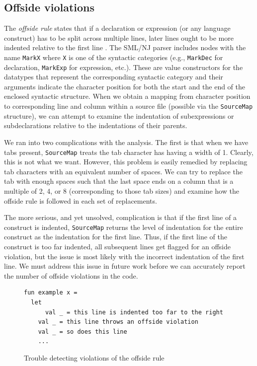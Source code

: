 \documentclass[12pt,abstracton]{scrartcl}
\begin{document}
\subsection{Offside violations}\label{subsec:offside}
The \emph{offside rule} states that if a declaration or expression (or any language construct)
has to be split across multiple lines, later lines ought to be more indented relative to
the first line \cite{Lan66}.
The SML/NJ parser includes nodes with the name \texttt{MarkX} where \texttt{X} is
one of the syntactic categories (e.g., \texttt{MarkDec} for declaration, \texttt{MarkExp} for expression,
etc.). These are value constructors for the datatypes that represent the corresponding
syntactic category and their arguments indicate the character position for both the start and the
end of the enclosed syntactic structure. When we obtain a mapping from character position
to corresponding line and column within a source file (possible via the \texttt{SourceMap} structure),
we can attempt to examine the indentation of subexpressions or subdeclarations relative to
the indentations of their parents.

We ran into two complications with the analysis. The first is that when we have tabs present,
\texttt{SourceMap} treats the tab character has having a width of 1. Clearly,
this is not what we want. However, this problem is easily remedied 
by replacing tab characters with an equivalent number of spaces.
We can try to replace the tab with enough spaces such that
the last space ends on a column that is a multiple of 2, 4, or 8 (corresponding to those tab sizes)
and examine how the offside rule is followed in each set of replacements.

The more serious, and yet unsolved, complication is that if the first line of a construct
is indented, \texttt{SourceMap} returns the level of indentation
for the entire construct as the indentation for the first line.
Thus, if the first line of the construct is too far indented, all subsequent
lines get flagged for an offside violation, but the issue is most likely
with the incorrect indentation of the first line. We must address this
issue in future work before we can accurately report the number
of offside violations in the code.
\begin{figure}[bh!]
\centering
\begin{verbatim}
fun example x =
  let
      val _ = this line is indented too far to the right
    val _ = this line throws an offside violation
    val _ = so does this line
    ...
\end{verbatim}
\caption{Trouble detecting violations of the offside rule}
\label{fig:offside}
\end{figure}
\end{document}
